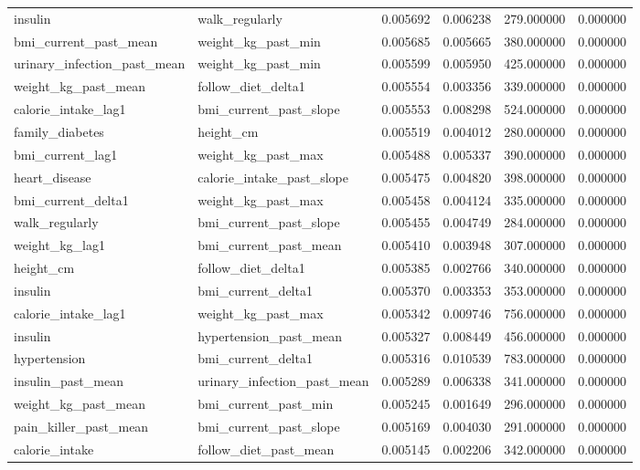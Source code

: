 \begin{longtable}{llrrrr}
insulin & walk\_regularly & 0.005692 & 0.006238 & 279.000000 & 0.000000 \\
bmi\_current\_past\_mean & weight\_kg\_past\_min & 0.005685 & 0.005665 & 380.000000 & 0.000000 \\
urinary\_infection\_past\_mean & weight\_kg\_past\_min & 0.005599 & 0.005950 & 425.000000 & 0.000000 \\
weight\_kg\_past\_mean & follow\_diet\_delta1 & 0.005554 & 0.003356 & 339.000000 & 0.000000 \\
calorie\_intake\_lag1 & bmi\_current\_past\_slope & 0.005553 & 0.008298 & 524.000000 & 0.000000 \\
family\_diabetes & height\_cm & 0.005519 & 0.004012 & 280.000000 & 0.000000 \\
bmi\_current\_lag1 & weight\_kg\_past\_max & 0.005488 & 0.005337 & 390.000000 & 0.000000 \\
heart\_disease & calorie\_intake\_past\_slope & 0.005475 & 0.004820 & 398.000000 & 0.000000 \\
bmi\_current\_delta1 & weight\_kg\_past\_max & 0.005458 & 0.004124 & 335.000000 & 0.000000 \\
walk\_regularly & bmi\_current\_past\_slope & 0.005455 & 0.004749 & 284.000000 & 0.000000 \\
weight\_kg\_lag1 & bmi\_current\_past\_mean & 0.005410 & 0.003948 & 307.000000 & 0.000000 \\
height\_cm & follow\_diet\_delta1 & 0.005385 & 0.002766 & 340.000000 & 0.000000 \\
insulin & bmi\_current\_delta1 & 0.005370 & 0.003353 & 353.000000 & 0.000000 \\
calorie\_intake\_lag1 & weight\_kg\_past\_max & 0.005342 & 0.009746 & 756.000000 & 0.000000 \\
insulin & hypertension\_past\_mean & 0.005327 & 0.008449 & 456.000000 & 0.000000 \\
hypertension & bmi\_current\_delta1 & 0.005316 & 0.010539 & 783.000000 & 0.000000 \\
insulin\_past\_mean & urinary\_infection\_past\_mean & 0.005289 & 0.006338 & 341.000000 & 0.000000 \\
weight\_kg\_past\_mean & bmi\_current\_past\_min & 0.005245 & 0.001649 & 296.000000 & 0.000000 \\
pain\_killer\_past\_mean & bmi\_current\_past\_slope & 0.005169 & 0.004030 & 291.000000 & 0.000000 \\
calorie\_intake & follow\_diet\_past\_mean & 0.005145 & 0.002206 & 342.000000 & 0.000000 \\

\end{longtable}
